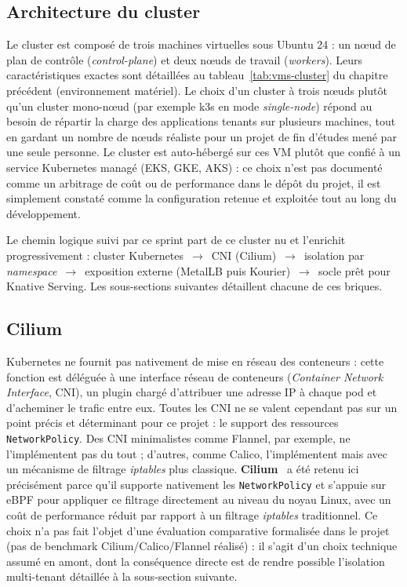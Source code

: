 \subsection{Architecture du cluster}

Le cluster est composé de trois machines virtuelles sous Ubuntu 24 : un nœud de plan de contrôle (\textit{control-plane}) et deux nœuds de travail (\textit{workers}). Leurs caractéristiques exactes sont détaillées au tableau~\ref{tab:vms-cluster} du chapitre précédent (environnement matériel). Le choix d'un cluster à trois nœuds plutôt qu'un cluster mono-nœud (par exemple k3s en mode \textit{single-node}) répond au besoin de répartir la charge des applications tenants sur plusieurs machines, tout en gardant un nombre de nœuds réaliste pour un projet de fin d'études mené par une seule personne. Le cluster est auto-hébergé sur ces VM plutôt que confié à un service Kubernetes managé (EKS, GKE, AKS) : ce choix n'est pas documenté comme un arbitrage de coût ou de performance dans le dépôt du projet, il est simplement constaté comme la configuration retenue et exploitée tout au long du développement.

Le chemin logique suivi par ce sprint part de ce cluster nu et l'enrichit progressivement : cluster Kubernetes~$\rightarrow$~CNI (Cilium)~$\rightarrow$~isolation par \textit{namespace}~$\rightarrow$~exposition externe (MetalLB puis Kourier)~$\rightarrow$~socle prêt pour Knative Serving. Les sous-sections suivantes détaillent chacune de ces briques.

\subsection{Cilium}

Kubernetes ne fournit pas nativement de mise en réseau des conteneurs : cette fonction est déléguée à une interface réseau de conteneurs (\textit{Container Network Interface}, CNI), un plugin chargé d'attribuer une adresse IP à chaque pod et d'acheminer le trafic entre eux. Toutes les CNI ne se valent cependant pas sur un point précis et déterminant pour ce projet : le support des ressources \texttt{NetworkPolicy}. Des CNI minimalistes comme Flannel, par exemple, ne l'implémentent pas du tout ; d'autres, comme Calico, l'implémentent mais avec un mécanisme de filtrage \textit{iptables} plus classique. \textbf{Cilium}~\citep{CiliumDoc} a été retenu ici précisément parce qu'il supporte nativement les \texttt{NetworkPolicy} et s'appuie sur eBPF pour appliquer ce filtrage directement au niveau du noyau Linux, avec un coût de performance réduit par rapport à un filtrage \textit{iptables} traditionnel. Ce choix n'a pas fait l'objet d'une évaluation comparative formalisée dans le projet (pas de benchmark Cilium/Calico/Flannel réalisé) : il s'agit d'un choix technique assumé en amont, dont la conséquence directe est de rendre possible l'isolation multi-tenant détaillée à la sous-section suivante.

